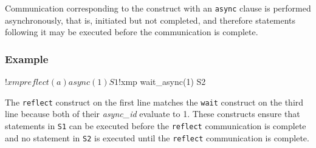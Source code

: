 Communication corresponding to the construct with an {\tt async} clause
is performed asynchronously, that is, initiated but not completed,
and therefore statements following it may be executed before the
communication is complete.

\subsubsection*{Example}

\begin{Fexample}
!$xmp reflect (a) async(1)
      S1
!$xmp wait_async(1)
      S2
\end{Fexample}

The {\tt reflect} construct on the first line matches
the {\tt wait} construct on the third line because both of their {\it
async\_id} evaluate to 1.
%
These constructs ensure that statements in {\tt S1} can be executed
before the {\tt reflect} communication is complete and no statement in
{\tt S2} is executed until the {\tt reflect} communication is
complete.

